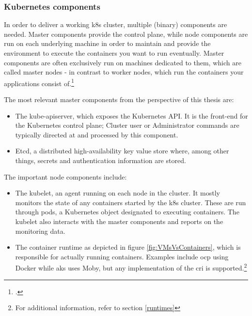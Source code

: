 \subsubsection{Kubernetes components} \label{k8sComponents}

In order to deliver a working \gls{k8s} cluster, multiple (binary) components are needed.
Master components provide the control plane, while node components are run on each underlying machine in order to maintain and provide the environment to execute the containers you want to run eventually.
Master components are often exclusively run on machines dedicated to them, which are called master nodes - in contrast to worker nodes, which run the containers your applications consist of.\footcite[][, section 'Master Components']{k8sComponents}

The most relevant master components from the perspective of this thesis are:
\begin{itemize}

\item The kube-apiserver, which exposes the Kubernetes API. It is the front-end for the Kubernetes control plane; Cluster user or Administrator commands are typically directed at and processed by this component.

\item Etcd, a distributed high-availability key value store where, among other things, secrets and authentication information are stored.

\end{itemize}

The important node components include:
\begin{itemize}

\item The kubelet, an agent running on each node in the cluster. It mostly monitors the state of any containers started by the \gls{k8s} cluster. These are run through pods, a Kubernetes object designated to executing containers. The kubelet also interacts with the master components and reports on the monitoring data.

\item The container runtime as depicted in figure \ref{fig:VMsVsContainers}, which is responsible for actually running containers. Examples include \gls{ocp} using Docker while \gls{aks} uses Moby, but any implementation of the \gls{cri} is supported.\footnote{For additional information, refer to section \ref{runtimes}} 

\end{itemize}

